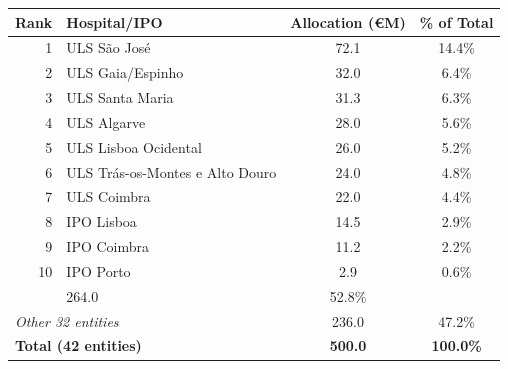 \begin{tabular}{rlcc}
\toprule
Rank & Hospital/IPO & Allocation (€M) & \% of Total \\
\midrule
1 & ULS São José & 72.1 & 14.4\% \\
2 & ULS Gaia/Espinho & 32.0 & 6.4\% \\
3 & ULS Santa Maria & 31.3 & 6.3\% \\
4 & ULS Algarve & 28.0 & 5.6\% \\
5 & ULS Lisboa Ocidental & 26.0 & 5.2\% \\
6 & ULS Trás-os-Montes e Alto Douro & 24.0 & 4.8\% \\
7 & ULS Coimbra & 22.0 & 4.4\% \\
8 & IPO Lisboa & 14.5 & 2.9\% \\
9 & IPO Coimbra & 11.2 & 2.2\% \\
10 & IPO Porto & 2.9 & 0.6\% \\
\addlinespace
\multicolumn{2}{l}{\textit{Top 10 subtotal}} & 264.0 & 52.8\% \\
\multicolumn{2}{l}{\textit{Other 32 entities}} & 236.0 & 47.2\% \\
\midrule
\multicolumn{2}{l}{\textbf{Total (42 entities)}} & \textbf{500.0} & \textbf{100.0\%} \\
\bottomrule
\end{tabular}
